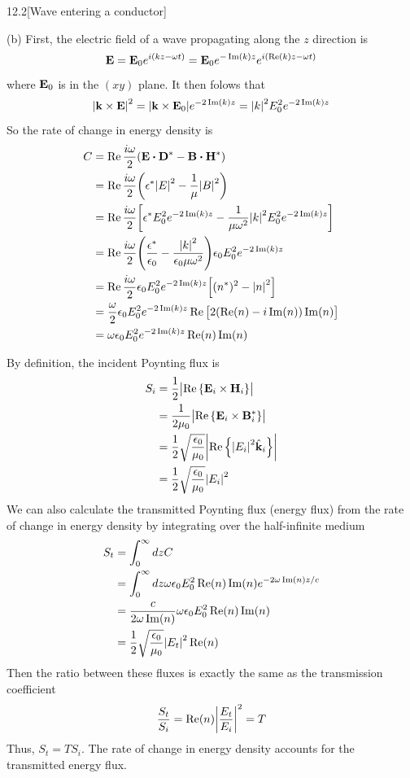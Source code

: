 \documentclass[12pt]{article}
\begin{document}
\begin{problem}{12.2}[Wave entering a conductor]
\begin{solution}
(b) First, the electric field of a wave propagating along the $z$ direction is
\begin{equation}
    \vb{E}=\vb{E}_0e^{i(kz-\omega t)} 
    =\vb{E}_0e^{-\Im(k)z}e^{i(\Re(k)z-\omega t)}
\end{equation}
where $\vb{E}_0$ is in the $(xy)$ plane. It then folows that
\begin{equation}
    \abs{\vb{k}\times\vb{E}}^2
    =\abs{\vb{k}\times\vb{E}_0}e^{-2\Im(k)z}
    =\abs{k}^2E_0^2e^{-2\Im(k)z}
\end{equation}
So the rate of change in energy density is
\begin{align}
    C
    &=\Re\frac{i\omega}{2}\qty(\vb{E}\vdot\vb{D}^\ast-\vb{B}\vdot\vb{H}^\ast)\notag\\
    &=\Re\frac{i\omega}{2}\qty(\epsilon^\ast\abs{E}^2-\frac1{\mu}\abs{B}^2)\notag\\
    &=\Re\frac{i\omega}{2}\qty[\epsilon^\ast
    E_0^2e^{-2\Im(k)z}-\frac1{\mu\omega^2}\abs{k}^2E_0^2e^{-2\Im(k)z}]\notag\\
    &=\Re\frac{i\omega}{2}\qty(\frac{\epsilon^\ast}{\epsilon_0}-\frac{\abs{k}^2}{\epsilon_0\mu\omega^2})\epsilon_0E_0^2e^{-2\Im(k)z}\notag\\
    &=\Re\frac{i\omega}{2}\epsilon_0E_0^2e^{-2\Im(k)z}\qty[(n^\ast)^2-\abs{n}^2]\notag\\
    &=\frac{\omega}{2}\epsilon_0E_0^2e^{-2\Im(k)z}\Re\qty[2(\Re(n)-i\Im(n))\Im(n)]\notag\\
    &=\omega\epsilon_0E_0^2e^{-2\Im(k)z}\Re(n)\Im(n)
\end{align}

By definition, the incident Poynting flux is
\begin{align}
    S_i&=\frac12\abs{\Re\qty{\vb{E}_i\times\vb{H}_i}}\notag\\
    &=\frac1{2\mu_0}\abs{\Re\qty{\vb{E}_i\times\vb{B}_i^\ast}}\notag\\
    &=\frac12\sqrt{\frac{\epsilon_0}{\mu_0}}\abs{\Re\qty{\abs{E_i}^2\hat{\vb{k}}_i}}\notag\\
    &=\frac12\sqrt{\frac{\epsilon_0}{\mu_0}}\abs{E_i}^2
\end{align}
We can also calculate the transmitted Poynting flux (energy flux) from the rate
of change in energy density by integrating over the half-infinite medium
\begin{align}
    S_t
    &=\int_0^\infty dzC\notag\\
    &=\int_0^\infty
    dz\omega\epsilon_0E_0^2\Re(n)\Im(n)e^{-2\omega\Im(n)z/c}\notag\\
    &=\frac{c}{2\omega\Im(n)}\omega\epsilon_0E_0^2\Re(n)\Im(n)\notag\\
    &=\frac12\sqrt{\frac{\epsilon_0}{\mu_0}}\abs{E_t}^2\Re(n)
\end{align}
Then the ratio between these fluxes is exactly the same as the transmission
coefficient
\begin{equation}
    \frac{S_t}{S_i}=\Re(n)\abs{\frac{E_t}{E_i}}^2=T 
\end{equation}
Thus, $S_t=TS_i$. The rate of change in energy density accounts for the
transmitted energy flux.


\end{solution}
\end{problem}
\end{document}
